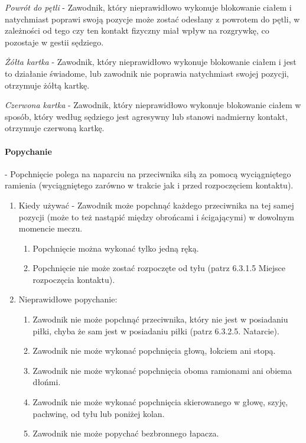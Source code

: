 \documentclass[12pt]{article}
\begin{document}
\emph{Powrót do pętli} - Zawodnik, który nieprawidłowo wykonuje
blokowanie ciałem i natychmiast poprawi swoją pozycje może zostać
odesłany z powrotem do pętli, w zależności od tego czy ten kontakt
fizyczny miał wpływ na rozgrywkę, co pozostaje w gestii sędziego.

\emph{Żółta kartka} - Zawodnik, który nieprawidłowo wykonuje blokowanie
ciałem i jest to działanie świadome, lub zawodnik nie poprawia
natychmiast swojej pozycji, otrzymuje żółtą kartkę.

\emph{Czerwona kartka} - Zawodnik, który nieprawidłowo wykonuje
blokowanie ciałem w sposób, który według sędziego jest agresywny lub
stanowi nadmierny kontakt, otrzymuje czerwoną kartkę.

\paragraph{Popychanie} - Popchnięcie polega na naparciu na
przeciwnika siłą za pomocą wyciągniętego ramienia (wyciągniętego zarówno
w trakcie jak i przed rozpoczęciem kontaktu).

\begin{enumerate}
\item
    Kiedy używać - Zawodnik może popchnąć każdego przeciwnika na tej samej
  pozycji (może to też nastąpić między obrońcami i ścigającymi) w
  dowolnym momencie meczu.
  
  \begin{enumerate}
  \item
        Popchnięcie można wykonać tylko jedną ręką.
      \item
        Popchnięcie nie może zostać rozpoczęte od tyłu (patrz 6.3.1.5
    Miejsce rozpoczęcia kontaktu).
      \end{enumerate}
\item
    Nieprawidłowe popychanie:
  
  \begin{enumerate}
  \item
        Zawodnik nie może popchnąć przeciwnika, który nie jest w posiadaniu
    piłki, chyba że sam jest w posiadaniu piłki (patrz 6.3.2.5.
    Natarcie).
      \item
        Zawodnik nie może wykonać popchnięcia głową, łokciem ani stopą.
      \item
        Zawodnik nie może wykonać popchnięcia oboma ramionami ani obiema
    dłońmi.
      \item
        Zawodnik nie może wykonać popchnięcia skierowanego w głowę, szyję,
    pachwinę, od tyłu lub poniżej kolan.
      \item
        Zawodnik nie może popychać bezbronnego łapacza.
      \end{enumerate}
\end{enumerate}
\end{document}
